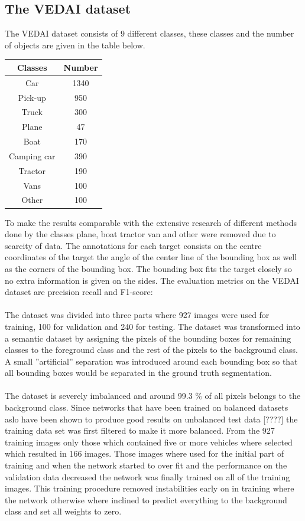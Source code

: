 \documentclass{kththesis}
\begin{document}
\subsection{The VEDAI dataset}
The VEDAI dataset \cite{razakarivony_vehicle_2015} consists of 9 different classes, these classes and the number of objects are given in the table below.\begin{center}
\begin{tabular}{|c|c|}
\hline
\textbf{Classes} & \textbf{Number}\\
\hline
Car & 1340\\
Pick-up & 950\\
Truck & 300\\
Plane & 47\\
Boat & 170\\
Camping car & 390\\
Tractor & 190\\
Vans & 100\\
Other & 100\\
\hline
\end{tabular}
\end{center}
To make the results comparable with the extensive research of different methods done by \cite{zhong_robust_2017} the classes plane, boat tractor van and other were removed due to scarcity of data.  The annotations for each target consists on the centre coordinates of the target the angle of the center line of the bounding box as well as the corners of the bounding box. The bounding box fits the target closely so no extra information is given on the sides. The evaluation metrics on the VEDAI dataset are precision recall and F1-score:\\
\\
The dataset was divided into three parts where 927 images were used for training, 100 for validation and 240 for testing. The dataset was transformed into a semantic dataset by assigning the pixels of the bounding boxes for remaining classes to the foreground class and the rest of the pixels to the background class. A small ''artificial'' separation was introduced around each bounding box so that all bounding boxes would be separated in the ground truth segmentation.\\
\\
The dataset is severely imbalanced and around 99.3 \% of all pixels belongs to the background class. Since networks that have been trained on balanced datasets aslo have been shown to produce good results on unbalanced test data [????] the training data set was first filtered to make it more balanced. From the 927 training images only those which contained five or more vehicles where selected which resulted in 166 images. Those images where used for the initial part of training and when the network started to over fit and the performance on the validation data decreased the network was finally trained on all of the training images. This training procedure removed instabilities early on in training where the network otherwise where inclined to predict everything to the background class and set all weights to zero.
\end{document}
